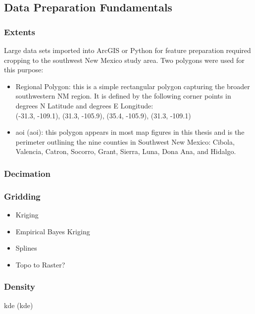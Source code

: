 \subsection{Data Preparation Fundamentals}

\subsubsection{Extents}

Large data sets imported into ArcGIS or Python for feature preparation required cropping to the southwest New Mexico study area. Two polygons were used for this purpose:

\begin{itemize}
\item Regional Polygon: this is a simple rectangular polygon capturing the broader southwestern NM region. It is defined by the following corner points in degrees N Latitude and degrees E Longitude: \\ (-31.3, -109.1), (31.3, -105.9), (35.4, -105.9), (31.3, -109.1)
\item \acrlong{aoi} (\acrshort{aoi}): this polygon appears in most map figures in this thesis and is the perimeter outlining the nine counties in Southwest New Mexico: Cibola, Valencia, Catron, Socorro, Grant, Sierra, Luna, Dona Ana, and Hidalgo.
\end{itemize}

\subsubsection{Decimation}\label{ssn:fishnet}

\subsubsection{Gridding}

\begin{itemize}
\item Kriging \label{ssn:kriging}

\item{Empirical Bayes Kriging}\label{ssn:ebk}

\item{Splines}

\item{Topo to Raster?}
\end{itemize}

\subsubsection{Density}
\acrlong{kde} (\acrshort{kde})\label{ssn:kde}

